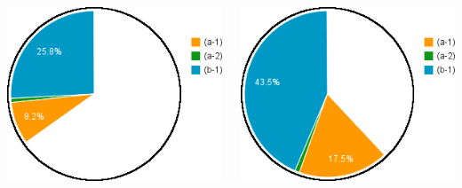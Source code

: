 \documentclass[compress]{beamer}
\begin{document}
\begin{frame}
\begin{columns}
\includegraphics[width=\linewidth]{chart2d_2mu_200.png}

\includegraphics[width=\linewidth]{chart2d_2mu_400.png}


\end{columns}
\end{frame}
\end{document}
